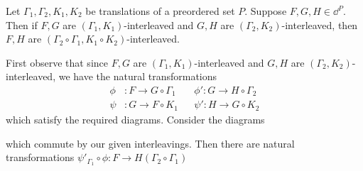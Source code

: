 \begin{proposition}
    Let $\Gamma_1, \Gamma_2, K_1, K_2$ be translations of a preordered set $P$. 
    Suppose $F, G, H \in \dd^P$. Then if $F,G$ are $(\Gamma_1,  K_1)$-interleaved 
    and $G, H$ are $(\Gamma_2, K_2)$-interleaved, then $F,H$ are $(\Gamma_2\circ\Gamma_1, K_1\circ K_2)$-interleaved. 
\end{proposition}

\begin{prf}
    First observe that since  $F, G$ are $(\Gamma_1, K_1)$-interleaved and 
    $G,H$ are $(\Gamma_2, K_2)$-interleaved, we have the natural transformations 
    \begin{align*}
        \phi&: F \to G \circ \Gamma_1  &&\phi': G \to H\circ \Gamma_2\\
        \psi&: G \to F\circ K_1 &&\psi':  H \to G\circ K_2
    \end{align*}
    which satisfy the required diagrams. Consider the diagrams  
    \begin{center}
    \end{center}
    which commute by our given interleavings.
    Then there are natural transformations $\psi'_{\Gamma_1} \circ \phi: F \to H(\Gamma_2\circ\Gamma_1)$ 

\end{prf}
